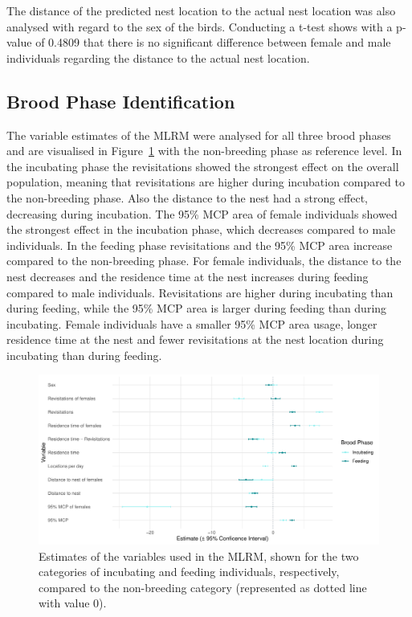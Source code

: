 The distance of the predicted nest location to the actual nest location was also analysed with regard to the sex of the birds. Conducting a t-test shows with a p-value of 0.4809 that there is no significant difference between female and male individuals regarding the distance to the actual nest location.



\subsection{Brood Phase Identification}
The variable estimates of the MLRM were analysed for all three brood phases and are visualised in Figure~\ref{figure:variable_estimates} with the non-breeding phase as reference level. In the incubating phase the revisitations showed the strongest effect on the overall population, meaning that revisitations are higher during incubation compared to the non-breeding phase. Also the distance to the nest had a strong effect, decreasing during incubation. The 95\% MCP area of female individuals showed the strongest effect in the incubation phase, which decreases compared to male individuals. In the feeding phase revisitations and the 95\% MCP area increase compared to the non-breeding phase. For female individuals, the distance to the nest decreases and the residence time at the nest increases during feeding compared to male individuals. Revisitations are higher during incubating than during feeding, while the 95\% MCP area is larger during feeding than during incubating. Female individuals have a smaller 95\% MCP area usage, longer residence time at the nest and fewer revisitations at the nest location during incubating than during feeding.


\begin{figure}[H]
\centering
\includegraphics[width=1\textwidth]{figures/results/04_coefplot_bm_15_separated_combined.pdf}
\caption[Variable estimates of the MLRM]{Estimates of the variables used in the MLRM, shown for the two categories of incubating and feeding individuals, respectively, compared to the non-breeding category (represented as dotted line with value 0).}
\label{figure:variable_estimates}
\end{figure}


